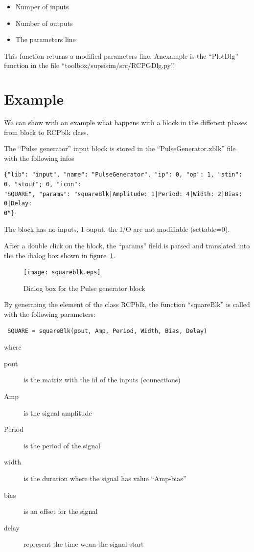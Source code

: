 \begin{itemize}
\item Numper of inputs
\item Number of outputs
\item The parameters line
\end{itemize}

This function returns a modified parameters line. Anexample is the ``PlotDlg'' 
function in the file ``toolbox/supsisim/src/RCPGDlg.py''.

\section{Example}
We can show with an example what happens with a block in the different phases 
from block to RCPblk class.

The ``Pulse generator'' input block is stored in the ``PulseGenerator.xblk'' 
file with 
the following infos

\tiny
\begin{verbatim}
{"lib": "input", "name": "PulseGenerator", "ip": 0, "op": 1, "stin": 0, "stout"; 0, "icon": 
"SQUARE", "params": "squareBlk|Amplitude: 1|Period: 4|Width: 2|Bias: 0|Delay: 
0"}
\end{verbatim}
\normalsize

The block has no inputs, 1 ouput, the I/O are not modifiable (settable=0).

After a double click on the block, the ``params'' field is parsed and 
translated 
into the the dialog box shown in figure~\ref{Fig:squareblk}.

 \begin{figure}[htbp]	
 \centering
 \texttt{[image: squareblk.eps]}
 \caption{Dialog box for the Pulse generator block}
 \label{Fig:squareblk}
 \end{figure}

 By generating the element of the class RCPblk, the function ``squareBlk'' is 
called with the following parameters:
 
 \begin{verbatim}
 SQUARE = squareBlk(pout, Amp, Period, Width, Bias, Delay)
 \end{verbatim}
 
 where
 
 \begin{description}
 \item[pout] is the matrix with the id of the inputs (connections)
 \item [Amp] is the signal amplitude
 \item [Period] is the period of the signal
 \item [width] is the duration where the signal has value ``Amp-bias''
 \item [bias] is an offset for the signal
 \item [delay] represent the time wenn the signal start
 \end{description}
 
